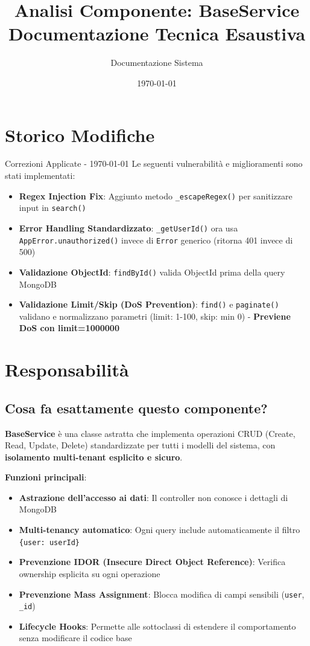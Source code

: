 \documentclass[11pt,a4paper]{article}
\title{\textbf{Analisi Componente: BaseService}\\
\large Documentazione Tecnica Esaustiva}
\author{Documentazione Sistema}
\date{\today}
\begin{document}
\maketitle
\tableofcontents
\newpage

\section{Storico Modifiche}

\begin{importantbox}{Correzioni Applicate - \today}
Le seguenti vulnerabilità e miglioramenti sono stati implementati:
\begin{itemize}
    \item \textbf{Regex Injection Fix}: Aggiunto metodo \texttt{\_escapeRegex()} per sanitizzare input in \texttt{search()}
    \item \textbf{Error Handling Standardizzato}: \texttt{\_getUserId()} ora usa \texttt{AppError.unauthorized()} invece di \texttt{Error} generico (ritorna 401 invece di 500)
    \item \textbf{Validazione ObjectId}: \texttt{findById()} valida ObjectId prima della query MongoDB
    \item \textbf{Validazione Limit/Skip (DoS Prevention)}: \texttt{find()} e \texttt{paginate()} validano e normalizzano parametri (limit: 1-100, skip: min 0) - \textbf{Previene DoS con limit=1000000}
\end{itemize}
\end{importantbox}

\section{Responsabilità}

\subsection{Cosa fa esattamente questo componente?}

\textbf{BaseService} è una classe astratta che implementa operazioni CRUD (Create, Read, Update, Delete) standardizzate per tutti i modelli del sistema, con \textbf{isolamento multi-tenant esplicito e sicuro}.

\textbf{Funzioni principali}:
\begin{itemize}
    \item \textbf{Astrazione dell'accesso ai dati}: Il controller non conosce i dettagli di MongoDB
    \item \textbf{Multi-tenancy automatico}: Ogni query include automaticamente il filtro \texttt{\{user: userId\}}
    \item \textbf{Prevenzione IDOR (Insecure Direct Object Reference)}: Verifica ownership esplicita su ogni operazione
    \item \textbf{Prevenzione Mass Assignment}: Blocca modifica di campi sensibili (\texttt{user}, \texttt{\_id})
    \item \textbf{Lifecycle Hooks}: Permette alle sottoclassi di estendere il comportamento senza modificare il codice base
\end{itemize}
\end{document}
